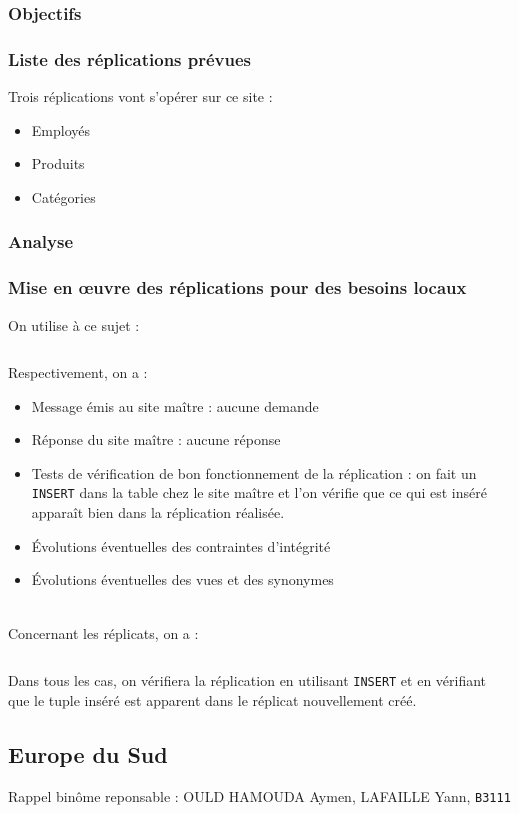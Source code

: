 \documentclass[10pt,a4paper]{article}
\theoremstyle{plain}
\begin{document}
\subsubsection{Objectifs}
%

\subsubsection{Liste des réplications prévues}
Trois réplications vont s'opérer sur ce site :
\begin{itemize}
    \item Employés
    \item Produits
    \item Catégories
\end{itemize}

\subsubsection{Analyse}
%

\subsubsection{Mise en \oe uvre des réplications pour des besoins locaux}
On utilise à ce sujet :
\inputminted{sql}{INSA-DB12-EuropeNord-replication.sql}
Respectivement, on a :
\begin{itemize}
    \item Message émis au site maître : aucune demande
    \item Réponse du site maître : aucune réponse
    \item Tests de vérification de bon fonctionnement de la réplication : on fait un \verb|INSERT| dans la table chez le site maître et l'on vérifie que ce qui est inséré apparaît bien dans la réplication réalisée.
    \item Évolutions éventuelles des contraintes d'intégrité
    \item Évolutions éventuelles des vues et des synonymes
\end{itemize}
~\\
Concernant les réplicats, on a :
\inputminted{sql}{INSA-DB12-EuropeNord-vues-replicats.sql}
Dans tous les cas, on vérifiera la réplication en utilisant \verb|INSERT| et en vérifiant que le tuple inséré est apparent dans le réplicat nouvellement créé.

\newpage

\subsection{Europe du Sud}
Rappel binôme reponsable : OULD HAMOUDA Aymen, LAFAILLE Yann, \verb|B3111|
\end{document}
